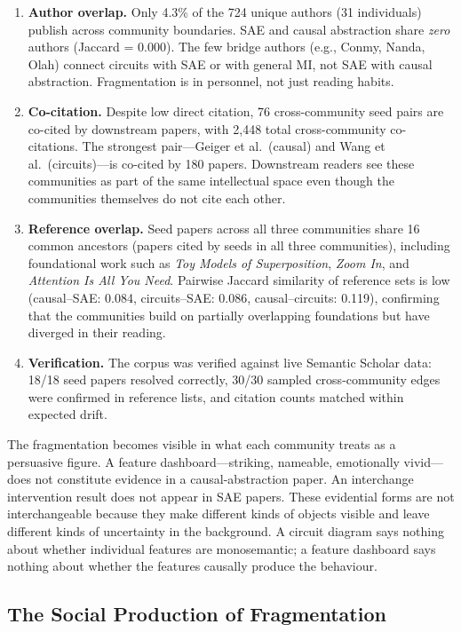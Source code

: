 \documentclass{article}
\begin{document}
\begin{enumerate}[leftmargin=*]
\item \textbf{Author overlap.} Only 4.3\% of the 724 unique authors (31 individuals) publish across community boundaries. SAE and causal abstraction share \emph{zero} authors (Jaccard = 0.000). The few bridge authors (e.g., Conmy, Nanda, Olah) connect circuits with SAE or with general MI, not SAE with causal abstraction. Fragmentation is in personnel, not just reading habits.
\item \textbf{Co-citation.} Despite low direct citation, 76 cross-community seed pairs are co-cited by downstream papers, with 2,448 total cross-community co-citations. The strongest pair---Geiger et al.\ (causal) and Wang et al.\ (circuits)---is co-cited by 180 papers. Downstream readers see these communities as part of the same intellectual space even though the communities themselves do not cite each other.
\item \textbf{Reference overlap.} Seed papers across all three communities share 16 common ancestors (papers cited by seeds in all three communities), including foundational work such as \emph{Toy Models of Superposition}, \emph{Zoom In}, and \emph{Attention Is All You Need}. Pairwise Jaccard similarity of reference sets is low (causal--SAE: 0.084, circuits--SAE: 0.086, causal--circuits: 0.119), confirming that the communities build on partially overlapping foundations but have diverged in their reading.
\item \textbf{Verification.} The corpus was verified against live Semantic Scholar data: 18/18 seed papers resolved correctly, 30/30 sampled cross-community edges were confirmed in reference lists, and citation counts matched within expected drift.
\end{enumerate}

The fragmentation becomes visible in what each community treats as a persuasive figure. A feature dashboard---striking, nameable, emotionally vivid---does not constitute evidence in a causal-abstraction paper. An interchange intervention result does not appear in SAE papers. These evidential forms are not interchangeable because they make different kinds of objects visible and leave different kinds of uncertainty in the background. A circuit diagram says nothing about whether individual features are monosemantic; a feature dashboard says nothing about whether the features causally produce the behaviour.

\subsection{The Social Production of Fragmentation}
\end{document}
